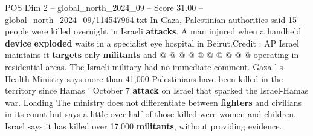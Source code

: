 \begin{textsample}{POS Dim 2 – global\_north\_2024\_09 – Score 31.00 – global\_north\_2024\_09/114547964.txt}
In Gaza, Palestinian authorities said 15 people were killed overnight in Israeli \textbf{attacks}.
A man injured when a handheld \textbf{device} \textbf{exploded} waits in a specialist eye hospital in Beirut.Credit : AP Israel maintains it \textbf{targets} only \textbf{militants} and @ @ @ @ @ @ @ @ @ @ operating in residential areas.
The Israeli military had no immediate comment.
Gaza ' s Health Ministry says more than 41,000 Palestinians have been killed in the territory since Hamas ' October 7 \textbf{attack} on Israel that sparked the Israel-Hamas war.
Loading The ministry does not differentiate between \textbf{fighters} and civilians in its count but says a little over half of those killed were women and children.
Israel says it has killed over 17,000 \textbf{militants}, without providing evidence.

\end{textsample}
